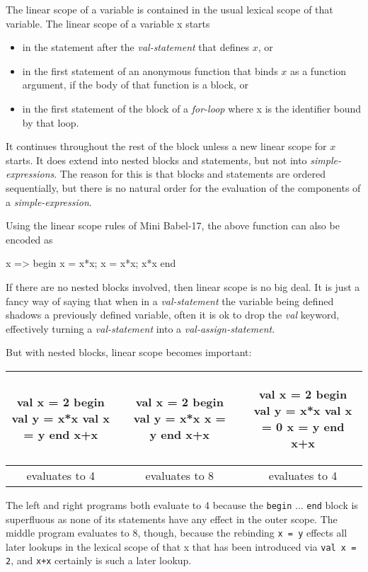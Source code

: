 \documentclass{llncs}
\newcommand{\bsrc}[1] {\lstinline!#1!}
\begin{document}
The linear scope of a variable is contained in the usual lexical scope of that variable.
The linear scope of a variable x starts 
\begin{itemize}
\item in the statement after the \emph{val-statement} that defines $x$, or 
\item in the first statement of an anonymous function that binds $x$ as a function argument, if the body of that function is a block, or
\item in the first statement of the block of a \emph{for-loop} where x is the identifier bound by that loop.
\end{itemize}
It continues throughout the rest of the block unless a new linear scope for $x$ starts. It does extend into nested blocks and statements, but not into \emph{simple-expressions}. The reason for this is that blocks and statements are ordered sequentially, but there is no natural order for the evaluation of the components of a \emph{simple-expression}. 

Using the linear scope rules of Mini Babel-17, the above function can also be encoded as
\begin{babellisting}
x => begin x = x*x; x = x*x; x*x end 
\end{babellisting}

If there are no nested blocks involved, then linear scope is no big deal. It is just a fancy way of saying that when in a \emph{val-statement} the variable being defined shadows a previously defined variable, often it is ok to drop the \emph{val} keyword, effectively turning a \emph{val-statement} into a \emph{val-assign-statement}. 

But with nested blocks, linear scope becomes important:
\begin{center}
\begin{tabular}{c|cc|cc}
\begin{babellisting}
val x = 2
begin
  val y = x*x
  val x = y
end
x+x  
\end{babellisting}
&
&
\begin{babellisting}
val x = 2
begin
  val y = x*x
  x = y
end
x+x 
\end{babellisting}
&
&
\begin{babellisting}
val x = 2
begin
  val y = x*x
  val x = 0
  x = y
end
x+x 
\end{babellisting}
\\\hline
evaluates to 4 & & evaluates to 8 & & evaluates to 4
\end{tabular}
\end{center}
The left and right programs both evaluate to 4 because the \bsrc{begin} ... \bsrc{end} block is superfluous as none of its statements have any effect in the outer scope.  The middle program evaluates to 8, though, because the rebinding \bsrc{x = y} effects all later lookups in the lexical scope of  that x that has been introduced via \bsrc{val x = 2}, and \bsrc{x+x} certainly is such a later lookup. 
\end{document}
